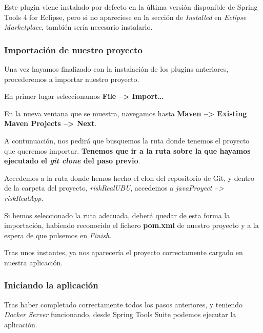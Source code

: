 Este plugin viene instalado por defecto en la última versión disponible de Spring Tools 4 for Eclipse, pero si no apareciese en la sección de \textit{Installed} en \textit{Eclipse Marketplace}, también sería necesario instalarlo.



\subsubsection{Importación de nuestro proyecto}

Una vez hayamos finalizado con la instalación de los plugins anteriores, procederemos a importar nuestro proyecto.

En primer lugar seleccionamos \textbf{File --> Import\dots}


En la nueva ventana que se muestra, navegamos hasta \textbf{Maven --> Existing Maven Projects --> Next}.


A contunuación, nos pedirá que busquemos la ruta donde tenemos el proyecto que queremos importar. \textbf{Tenemos que ir a la ruta sobre la que hayamos ejecutado el \textit{git clone} del paso previo}.

Accedemos a la ruta donde hemos hecho el clon del repositorio de Git, y dentro de la carpeta del proyecto, \textit{riskRealUBU}, accedemos a \textit{javaProyect --> riskRealApp}.

Si hemos seleccionado la ruta adecuada, deberá quedar de esta forma la importación, habiendo reconocido el fichero \textbf{pom.xml} de nuestro proyecto y a la espera de que pulsemos en \textit{Finish}.


Tras unos instantes, ya nos aparecería el proyecto correctamente cargado en nuestra aplicación.


\subsubsection{Iniciando la aplicación}

Tras haber completado correctamente todos los pasos anteriores, y teniendo \textit{Docker Server} funcionando, desde Spring Tools Suite podemos ejecutar la aplicación.

